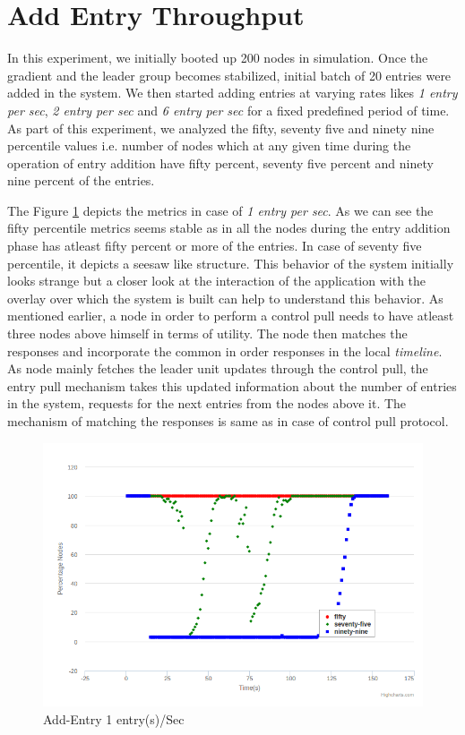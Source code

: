 \documentclass[12pt,a4paper,twoside,openright]{book}
\begin{document}
\section{Add Entry Throughput}

In this experiment, we initially booted up 200 nodes in simulation. Once the gradient and the leader group becomes stabilized, initial batch of 20 entries were added in the system. We then started adding entries at varying rates likes \textit{1 entry per sec}, \textit{2 entry per sec} and  \textit{6 entry per sec} for a fixed predefined period of time. As part of this experiment, we analyzed the fifty, seventy five and ninety nine percentile values i.e. number of nodes which at any given time during the operation of entry addition have fifty percent, seventy five percent and ninety nine percent of the entries. 

\par The Figure \ref{fig:addEntry1} depicts the metrics in case of \textit{1 entry per sec}. As we can see the fifty percentile metrics seems stable as in all the nodes during the entry addition phase has atleast fifty percent or more of the entries. In case of seventy five percentile, it depicts a seesaw like structure. This behavior of the system initially looks strange but a closer look at the interaction of the application with the overlay over which the system is built can help to understand this behavior. As mentioned earlier, a node in order to perform a control pull needs to have atleast three nodes above himself in terms of utility. The node then matches the responses and incorporate the common in order responses in the local \textit{timeline}. As node mainly fetches the leader unit updates through the control pull, the entry pull mechanism takes this updated information about the number of entries in the system, requests for the next entries from the nodes above it. The mechanism of matching the responses is same as in case of control pull protocol. 

\begin{figure}[h]
	\includegraphics[scale=0.5]{200-1EntryPerSec}
	\caption{Add-Entry 1 entry(s)/Sec}
	\label{fig:addEntry1}
\end{figure}
\end{document}
